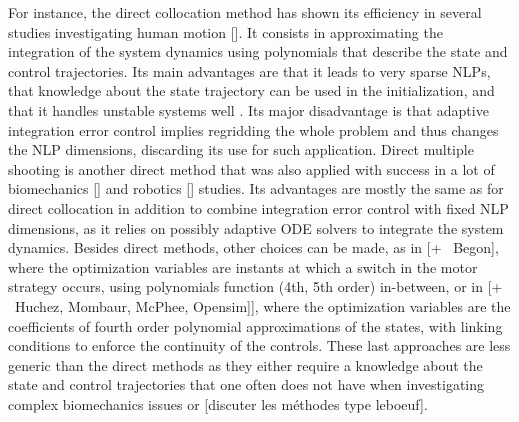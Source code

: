 For instance, the direct collocation method has shown its efficiency in several studies investigating human motion [\addref{}]. 
It consists in approximating the integration of the system dynamics using polynomials that describe the state and control trajectories.
Its main advantages are that it leads to very sparse NLPs, that knowledge about the state trajectory can be used in the initialization, and that it handles unstable systems well \cite{diehl2006fast}. 
Its major disadvantage is that adaptive integration error control implies regridding the whole problem and thus changes the NLP dimensions, discarding its use for such application.
Direct multiple shooting is another direct method that was also applied with success in a lot of biomechanics [\addref] and robotics [\addref] studies.
Its advantages are mostly the same as for direct collocation in addition to combine integration error control with fixed NLP dimensions, as it relies on possibly adaptive ODE solvers to integrate the system dynamics.
Besides direct methods, other choices can be made, as in \cite{yeadon2000mechanics} [+ \addref\ Begon], where the optimization variables are instants at which a switch in the motor strategy occurs, using polynomials function (4th, 5th order) in-between, or in \cite{leboeuf2006energetic} [+ \addref\  Huchez, Mombaur, McPhee, Opensim]], where the optimization variables are the coefficients of fourth order polynomial approximations of the states, with linking conditions to enforce the continuity of the controls. 
These last approaches are less generic than the direct methods as they either require a knowledge about the state and control trajectories that one often does not have when investigating complex biomechanics issues or [discuter les méthodes type leboeuf]. 


